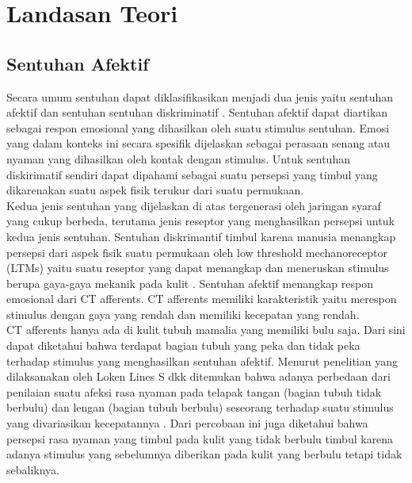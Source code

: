 \section{Landasan Teori}
  \subsection{Sentuhan Afektif}
    \indent Secara umum sentuhan dapat diklasifikasikan menjadi dua jenis yaitu sentuhan afektif dan sentuhan sentuhan diskriminatif \cite{Essick2010}⁠. Sentuhan afektif dapat diartikan sebagai respon emosional yang dihasilkan oleh suatu stimulus sentuhan. Emosi yang dalam konteks ini secara spesifik dijelaskan sebagai perasaan senang atau nyaman yang dihasilkan oleh kontak dengan stimulus. Untuk sentuhan diskirimatif sendiri dapat dipahami sebagai suatu persepsi yang timbul yang dikarenakan suatu aspek fisik terukur dari suatu permukaan. \\
     \indent Kedua jenis sentuhan yang dijelaskan di atas tergenerasi oleh jaringan syaraf yang cukup berbeda, terutama jenis reseptor yang menghasilkan persepsi untuk kedua jenis sentuhan. Sentuhan diskrimantif timbul karena manusia menangkap persepsi dari aspek fisik suatu permukaan oleh low threshold mechanoreceptor (LTMs) yaitu suatu reseptor yang dapat menangkap dan meneruskan stimulus berupa gaya-gaya mekanik pada kulit \cite{McGlone2007}⁠. Sentuhan afektif menangkap respon emosional dari CT afferents. CT afferents memiliki karakteristik yaitu merespon stimulus dengan gaya yang rendah dan memiliki kecepatan yang rendah\cite{McGlone2007}. \\
     \indent CT afferents hanya ada di kulit tubuh mamalia yang memiliki bulu saja\cite{Gordon2013}⁠. Dari sini dapat diketahui bahwa terdapat bagian tubuh yang  peka dan tidak peka terhadap stimulus yang menghasilkan sentuhan afektif. Menurut penelitian yang dilaksanakan oleh Loken Lines S dkk ditemukan bahwa adanya perbedaan dari penilaian suatu afeksi rasa nyaman pada telapak tangan (bagian tubuh tidak berbulu) dan lengan (bagian tubuh berbulu) seseorang terhadap suatu stimulus yang divariasikan kecepatannya \cite{Loken2011}⁠. Dari percobaan ini juga diketahui bahwa persepsi rasa nyaman yang timbul pada kulit yang tidak berbulu timbul karena adanya stimulus yang sebelumnya diberikan pada kulit yang berbulu tetapi tidak sebaliknya.
	
